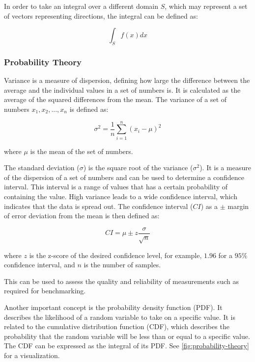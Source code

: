 In order to take an integral over a different domain $S$, which may represent a set of vectors representing directions, the integral can be defined as:

\begin{equation}
  \label{eqn:integral-domain}
  \int_{S} f(x) dx
\end{equation}

\newpage
\subsubsection{Probability Theory}
\label{sec:probabilityTheory}

Variance is a measure of dispersion, defining how large the difference between the average and the individual values in a set of numbers is. It is calculated as the average of the squared differences from the mean. The variance of a set of numbers $x_1, x_2, ..., x_n$ is defined as:

\begin{equation}
  \label{eqn:variance}
  \sigma^2 = \frac{1}{n} \sum_{i=1}^{n} (x_i - \mu)^2
\end{equation}

where $\mu$ is the mean of the set of numbers.

The standard deviation ($\sigma$) is the square root of the variance ($\sigma^2$). It is a measure of the dispersion of a set of numbers and can be used to determine a confidence interval. This interval is a range of values that has a certain probability of containing the value. High variance leads to a wide confidence interval, which indicates that the data is spread out. The confidence interval ($CI$) as a $\pm$ margin of error deviation from the mean is then defined as:

\begin{equation}
  \label{eqn:confidence-interval}
  CI = \mu \pm z \frac{\sigma}{\sqrt{n}}
\end{equation}

where $z$ is the z-score of the desired confidence level, for example, $1.96$ for a $95\%$ confidence interval, and $n$ is the number of samples.

This can be used to assess the quality and reliability of measurements such as required for benchmarking.

Another important concept is the probability density function (\gls{PDF}). It describes the likelihood of a random variable to take on a specific value. It is related to the cumulative distribution function (\gls{CDF}), which describes the probability that the random variable will be less than or equal to a specific value. The \gls{CDF} can be expressed as the integral of its \gls{PDF}. See \autoref{fig:probability-theory} for a visualization.

